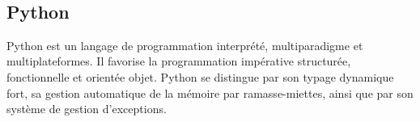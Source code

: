 \documentclass[11,5pt]{report}
\begin{document}
\begin{spacing}{2}
\begin{minipage}{\linewidth}
	\label{f3}%
\end{minipage}\\

\subsection{Python}\label{sec:Py}
Python est un langage de programmation interprété, multiparadigme et multiplateformes. Il favorise la programmation impérative structurée, fonctionnelle et orientée objet. Python se distingue par son typage dynamique fort, sa gestion automatique de la mémoire par ramasse-miettes, ainsi que par son système de gestion d'exceptions. \newline



\end{spacing}
\end{document}
